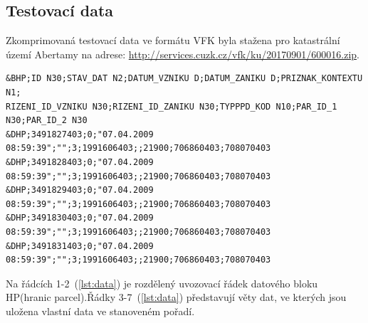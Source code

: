 \subsection{Testovací data}
Zkomprimovaná testovací data ve formátu VFK byla stažena pro katastrální území Abertamy na adrese: \href{http://services.cuzk.cz/vfk/ku/20170901/600016.zip}{http://services.cuzk.cz/vfk/ku/20170901/600016.zip}.
{\scriptsize
\begin{lstlisting}[caption=Ukázka bloku hranic parcel(HP) -- definice bloků a věty dat(zdroj:vlastní), label=lst:data]
&BHP;ID N30;STAV_DAT N2;DATUM_VZNIKU D;DATUM_ZANIKU D;PRIZNAK_KONTEXTU N1;
RIZENI_ID_VZNIKU N30;RIZENI_ID_ZANIKU N30;TYPPPD_KOD N10;PAR_ID_1 N30;PAR_ID_2 N30
&DHP;3491827403;0;"07.04.2009 08:59:39";"";3;1991606403;;21900;706860403;708070403 
&DHP;3491828403;0;"07.04.2009 08:59:39";"";3;1991606403;;21900;706860403;708070403
&DHP;3491829403;0;"07.04.2009 08:59:39";"";3;1991606403;;21900;706860403;708070403
&DHP;3491830403;0;"07.04.2009 08:59:39";"";3;1991606403;;21900;706860403;708070403
&DHP;3491831403;0;"07.04.2009 08:59:39";"";3;1991606403;;21900;706860403;708070403
\end{lstlisting}}
Na řádcích 1-2~(\ref{lst:data}) je rozdělený uvozovací řádek datového bloku HP(hranic parcel).Řádky 3-7~(\ref{lst:data}) představují věty dat, ve kterých jsou uložena vlastní data ve stanoveném pořadí.
